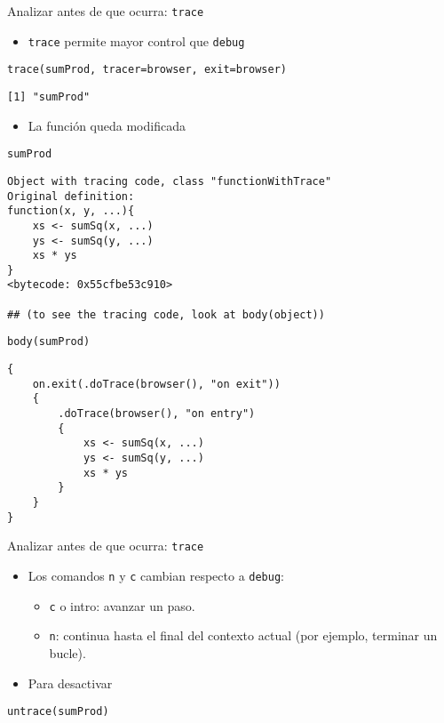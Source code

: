 \documentclass[xcolor={usenames,svgnames,dvipsnames}]{beamer}
\begin{document}
\begin{frame}[fragile,label={sec:orgd0c15b8}]{Analizar antes de que ocurra: \texttt{trace}}
 \begin{itemize}
\item \texttt{trace} permite mayor control que \texttt{debug}
\end{itemize}
\lstset{language=r,label= ,caption= ,captionpos=b,numbers=none}
\begin{lstlisting}
trace(sumProd, tracer=browser, exit=browser)
\end{lstlisting}

\begin{verbatim}
[1] "sumProd"
\end{verbatim}

\begin{itemize}
\item La función queda modificada
\end{itemize}
\lstset{language=r,label= ,caption= ,captionpos=b,numbers=none}
\begin{lstlisting}
sumProd
\end{lstlisting}

\begin{verbatim}
Object with tracing code, class "functionWithTrace"
Original definition: 
function(x, y, ...){
    xs <- sumSq(x, ...)
    ys <- sumSq(y, ...)
    xs * ys
}
<bytecode: 0x55cfbe53c910>

## (to see the tracing code, look at body(object))
\end{verbatim}

\lstset{language=r,label= ,caption= ,captionpos=b,numbers=none}
\begin{lstlisting}
body(sumProd)
\end{lstlisting}

\begin{verbatim}
{
    on.exit(.doTrace(browser(), "on exit"))
    {
        .doTrace(browser(), "on entry")
        {
            xs <- sumSq(x, ...)
            ys <- sumSq(y, ...)
            xs * ys
        }
    }
}
\end{verbatim}
\end{frame}

\begin{frame}[fragile,label={sec:org9582e38}]{Analizar antes de que ocurra: \texttt{trace}}
 \begin{itemize}
\item Los comandos \texttt{n} y \texttt{c} cambian respecto a \texttt{debug}:
\begin{itemize}
\item \texttt{c} o intro: avanzar un paso.
\item \texttt{n}: continua hasta el final del contexto actual (por ejemplo,
terminar un bucle).
\end{itemize}
\item Para desactivar
\end{itemize}
\lstset{language=r,label= ,caption= ,captionpos=b,numbers=none}
\begin{lstlisting}
untrace(sumProd)
\end{lstlisting}
\end{frame}
\end{document}
